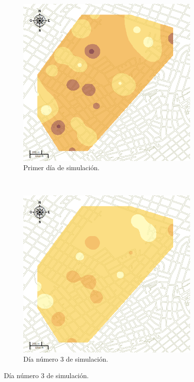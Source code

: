 \begin{figure}[!htbp]
    \centering
    \begin{subfigure}[b]{0.45\textwidth}
            \includegraphics[width=\textwidth]{capitulo-6/graphics/raster/temp-15-0.png}
            \caption{\label{fig:niveles-infestacion-15-a}Primer día de simulación.}
    \end{subfigure}
    ~~
    \begin{subfigure}[b]{0.45\textwidth}
            \includegraphics[width=\textwidth]{capitulo-6/graphics/raster/temp-15-2.png}
            \caption{\label{fig:niveles-infestacion-15-b}Día número 3 de simulación.}
    \end{subfigure}


\end{figure}
